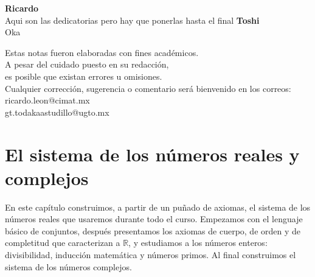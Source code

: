 \documentclass[12pt,a4paper]{book}
\begin{document}
        
    
  \thispagestyle{empty}
  

  \begin{flushright}
    \thispagestyle{empty}

    \textbf{Ricardo}\\[0.3cm]  
      Aqui son las dedicatorias pero hay que ponerlas hasta el final
      \textbf{Toshi}\\[0.3cm]
      Oka
  \end{flushright}


  \cleardoublepage
  \thispagestyle{empty}

  \begin{mdframed}[style=mdgreenbox]
    \begin{center}
    \small
    Estas notas fueron elaboradas con fines académicos.\\
    A pesar del cuidado puesto en su redacción,\\
    es posible que existan errores u omisiones.\\[0.3cm]

    Cualquier corrección, sugerencia o comentario será bienvenido
    en los correos: \\[0.3cm]

    ricardo.leon@cimat.mx\\
    gt.todakaastudillo@ugto.mx
    \end{center}
  \end{mdframed}

    
  \setcounter{page}{1}
  \tableofcontents

  \chapter{El sistema de los números reales y complejos}
 
  En este capítulo construimos, a partir de un puñado de axiomas, el sistema de los números reales que usaremos durante todo el curso. Empezamos con el lenguaje básico de conjuntos, después presentamos los axiomas de cuerpo, de orden y de completitud que caracterizan a $\mathbb{R}$, y estudiamos a los números enteros: divisibilidad, inducción matemática y números primos. Al final construimos el sistema de los números complejos.
  
\end{document}
